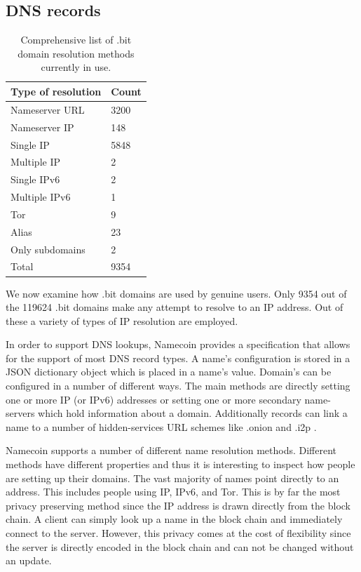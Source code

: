\subsection{DNS records}

\begin{table}[t]
\centering
\begin{tabular}{ll}
Type of resolution & Count \\ \hline
Nameserver URL     & 3200  \\
Nameserver IP      & 148   \\
Single IP          & 5848  \\
Multiple IP        & 2     \\
Single IPv6        & 2     \\
Multiple IPv6      & 1     \\
Tor                & 9    \\
Alias              & 23    \\
Only subdomains    & 2   \\ \hline
Total              & 9354
\end{tabular}
\caption{Comprehensive list of .bit domain resolution methods currently in use.}
\end{table}

We now examine how .bit domains are used by genuine users. Only 9354 out of the 119624 .bit domains make any attempt to resolve to an IP address. Out of these a variety of types of IP resolution are employed.

In order to support DNS lookups, Namecoin provides a specification that allows for the support of most DNS record types. A name's configuration is stored in a JSON dictionary object which is placed in a name's value. Domain's can be configured in a number of different ways. The main methods are directly setting one or more IP (or IPv6) addresses or setting one or more secondary name-servers which hold information about a domain. Additionally records can link a name to a number of hidden-services URL schemes like .onion \cite{onion} and .i2p \cite{i2p}.

Namecoin supports a number of different name resolution methods. Different methods have different properties and thus it is interesting to inspect how people are setting up their domains. The vast majority of names point directly to an address. This includes people using IP, IPv6, and Tor. This is by far the most privacy preserving method since the IP address is drawn directly from the block chain. A client can simply look up a name in the block chain and immediately connect to the server. However, this privacy comes at the cost of flexibility since the server is directly encoded in the block chain and can not be changed without an update.


